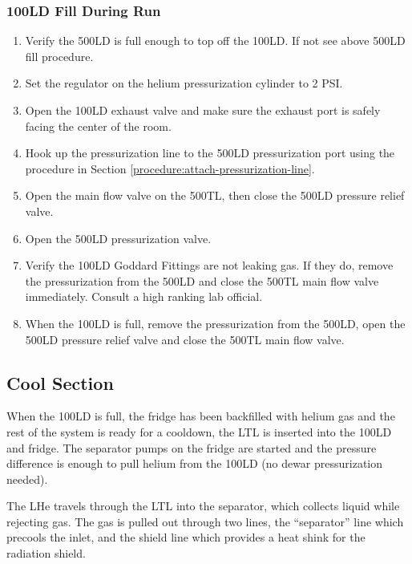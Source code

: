 \subsubsection{100LD Fill During Run}

\begin{enumerate}
 
 \item Verify the 500LD is full enough to top off the 100LD.  If not see above 500LD fill procedure.
 \item Set the regulator on the helium pressurization cylinder to 2 PSI.
 \item Open the 100LD exhaust valve and make sure the exhaust port is safely facing the center of the room.
 \item Hook up the pressurization line to the 500LD pressurization port using the procedure in Section \ref{procedure:attach-pressurization-line}.
 \item Open the main flow valve on the 500TL, then close the 500LD pressure relief valve.
 \item Open the 500LD pressurization valve.
 \item Verify the 100LD Goddard Fittings are not leaking gas.  If they do, remove the pressurization from the 500LD and close the 500TL main flow valve immediately.  Consult a high ranking lab official.
 \item When the 100LD is full, remove the pressurization from the 500LD, open the 500LD pressure relief valve and close the 500TL main flow valve.
 
\end{enumerate}


\subsection{Cool \hef{} Section}

When the 100LD is full, the fridge has been backfilled with helium gas and the rest of the system is ready for a cooldown, the LTL is inserted into the 100LD and fridge.  The separator pumps on the fridge are started and the pressure difference is enough to pull helium from the 100LD (no dewar pressurization needed).

The LHe travels through the LTL into the separator, which collects liquid while rejecting gas.  The gas is pulled out through two lines, the ``separator'' line which precools the \het{} inlet, and the shield line which provides a heat shink for the radiation shield.

